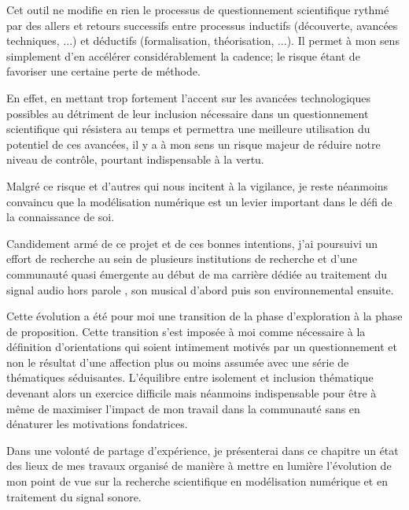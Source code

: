   Cet outil ne modifie en rien le processus de questionnement scientifique rythmé par des allers et retours successifs entre processus inductifs (découverte, avancées techniques, ...) et déductifs (formalisation, théorisation, ...). Il permet à mon sens simplement d'en accélérer considérablement la cadence; le risque étant de favoriser une certaine perte de méthode.

  En effet, en mettant trop fortement l'accent sur les avancées technologiques possibles au détriment de leur inclusion nécessaire dans un questionnement scientifique qui résistera au temps et permettra une meilleure utilisation du potentiel de ces avancées, il y a à mon sens un risque majeur de réduire notre niveau de contrôle, pourtant indispensable à la vertu.

  Malgré ce risque et d'autres qui nous incitent à la vigilance, je reste néanmoins convaincu que la modélisation numérique est un levier important dans le défi de la connaissance de soi.

  Candidement armé de ce projet et de ces bonnes intentions, j'ai poursuivi un effort de recherche au sein de plusieurs institutions de recherche et d'une communauté quasi émergente au début de ma carrière dédiée au traitement du signal audio \og hors parole \fg, son musical d'abord puis son environnemental ensuite. %

  Cette évolution a été pour moi une transition de la phase d'exploration à la phase de proposition. Cette transition s'est imposée à moi comme nécessaire à la définition d'orientations qui soient intimement motivés par un questionnement et non le résultat d'une affection plus ou moins assumée avec une série de thématiques séduisantes. L'équilibre entre isolement et inclusion thématique devenant alors un exercice difficile mais néanmoins indispensable pour être à même de maximiser l'impact de mon travail dans la communauté sans en dénaturer les motivations fondatrices.

  Dans une volonté de partage d'expérience, je présenterai dans ce chapitre un état des lieux de mes travaux organisé de manière à mettre en lumière l'évolution de mon point de vue sur la recherche scientifique en modélisation numérique et en traitement du signal sonore.

